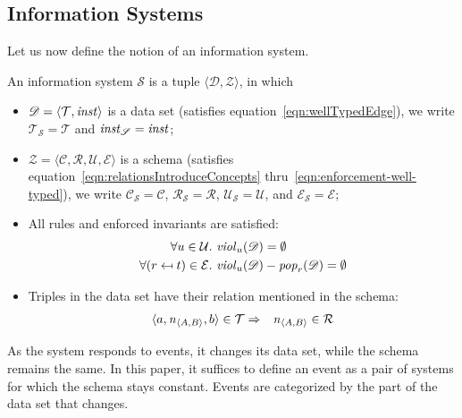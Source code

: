 \documentclass[runningheads]{llncs}
\newcommand{\id}[1]{\text{\it #1\/}}
\newcommand{\popF}[1]{\id{pop}_{#1}}
\newcommand{\pop}[2]{\popF{#1}(#2)}
\newcommand{\instance}{\mathbin{\id{inst}}}
\newcommand{\viol}[2]{\violC{#1}(#2)}
\newcommand{\violC}[1]{\id{viol}_{#1}}
\newcommand{\declare}[3]{\id{#1}_{\pair{#2}{#3}}}
\newcommand{\pair}[2]{\langle{#1},{#2}\rangle}
\newcommand{\triple}[3]{\langle{#1},{#2},{#3}\rangle}
\newcommand{\quadruple}[4]{\langle{#1},{#2},{#3},{#4}\rangle}
\newcommand{\concepts}{\mathcal{C}}
\newcommand{\rels}{\mathcal{R}}   %
\newcommand{\triples}{\mathcal{T}}
\newcommand{\enforces}{\mathcal{E}}
\newcommand{\rules}{\mathcal{U}}
\newcommand{\dataset}{\mathscr{D}}
\newcommand{\schema}{\mathscr{Z}}
\newcommand{\infsys}{\mathscr{S}}
\def\define#1{\label{dfn:#1}{\em #1}\index{#1}}
\begin{document}
\subsection{Information Systems}
\label{sct:Information Systems}
   Let us now define the notion of an information system.
\begin{definition}
\label{def:information system}
\item An information system $\infsys$ is a tuple $\pair{\dataset}{\schema}$, in which
\begin{itemize}
   \item $\dataset=\pair{\triples}{\instance}$ is a data set (satisfies equation~\ref{eqn:wellTypedEdge}), we write $\triples_\infsys = \triples$ and $\instance_\infsys = \instance$;
   \item $\schema=\quadruple{\concepts}{\rels}{\rules}{\enforces}$ is a schema (satisfies equation~\ref{eqn:relationsIntroduceConcepts} thru~\ref{eqn:enforcement-well-typed}), we write $\concepts_\infsys = \concepts$, $\rels_\infsys = \rels$, $\rules_\infsys=\rules$, and $\enforces_\infsys=\enforces$;
   \item All rules and enforced invariants are satisfied:
   \begin{align}
   \forall u\in\rules&.~\viol{u}{\dataset}=\emptyset\\
   \forall (r\mapsfrom t)\in\enforces&.~\viol{u}{\dataset} - \pop{r}{\dataset}=\emptyset
   \label{eqn:satisfaction}
   \end{align}
   \item Triples in the data set have their relation mentioned in the schema:
   \begin{eqnarray}
   \triple{a}{\declare{n}{A}{B}}{b}\in\triples&\Rightarrow&\declare{n}{A}{B}\in\rels
   \label{eqn:define R}
   \end{eqnarray}
\end{itemize}
\end{definition}

   As the system responds to events, it changes its data set, while the schema remains the same.
   In this paper, it suffices to define an event as a pair of systems for which the schema stays constant.
   Events are categorized by the part of the data set that changes.
   
\end{document}
